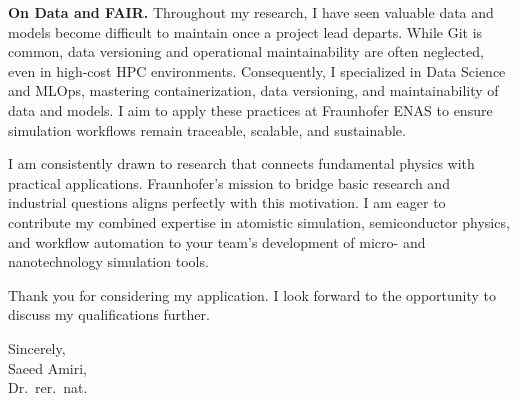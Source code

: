 {\textbf{On Data and FAIR.} Throughout my research, I have seen valuable data and models become difficult to maintain once a project lead departs. While Git is common, data versioning and operational maintainability are often neglected, even in high-cost HPC environments. Consequently, I specialized in Data Science and MLOps, mastering containerization, data versioning, and maintainability of data and models. I aim to apply these practices at Fraunhofer ENAS to ensure simulation workflows remain traceable, scalable, and sustainable.

\vspace{1em}
I am consistently drawn to research that connects fundamental physics with practical applications. Fraunhofer’s mission to bridge basic research and industrial questions aligns perfectly with this motivation. I am eager to contribute my combined expertise in atomistic simulation, semiconductor physics, and workflow automation to your team’s development of micro- and nanotechnology simulation tools.

\vspace{1em}
Thank you for considering my application. I look forward to the opportunity to discuss my qualifications further.

\vspace{1em}
Sincerely,\\

\vspace{1em}
Saeed Amiri,\\
Dr.\ rer.\ nat.

}